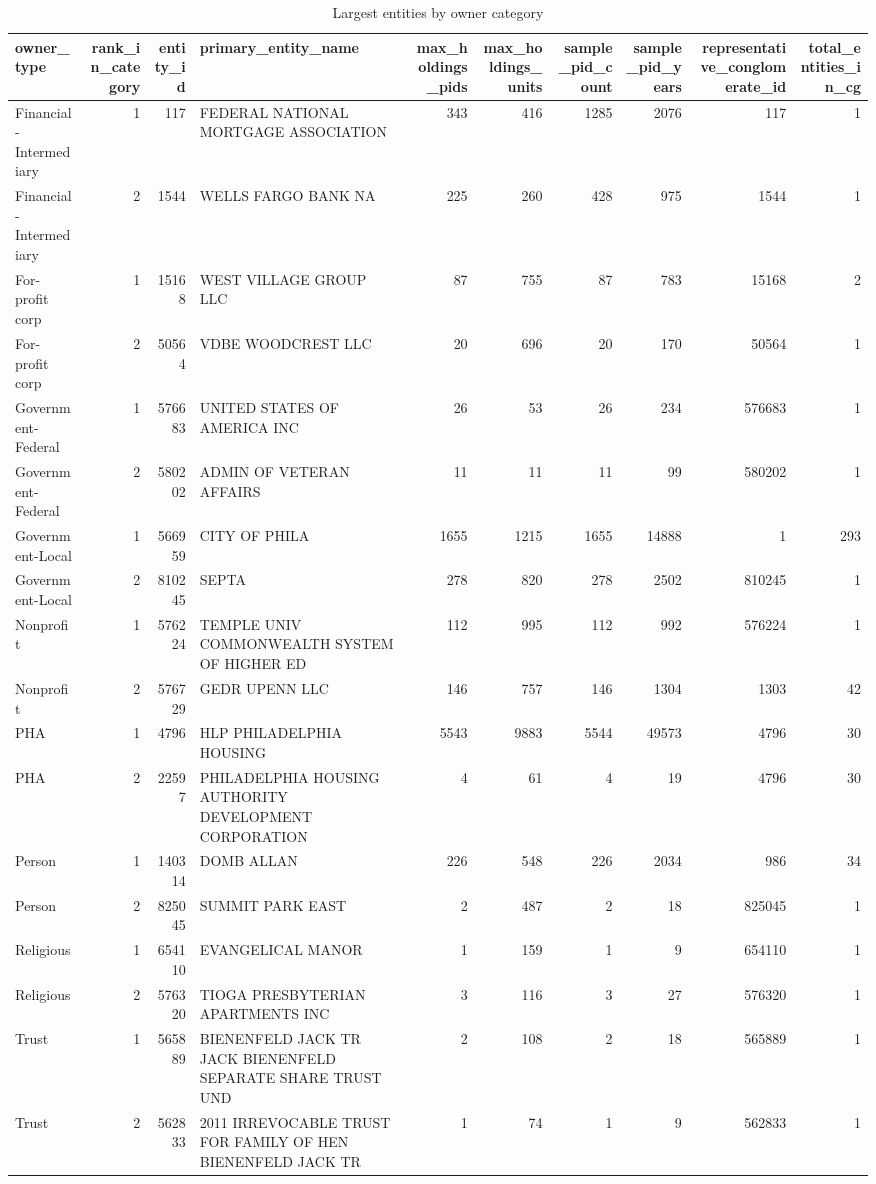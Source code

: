 \begin{table}

\caption{Largest entities by owner category}
\centering
\begin{tabular}[t]{lrrlrrrrrr}
\toprule
owner\_type & rank\_in\_category & entity\_id & primary\_entity\_name & max\_holdings\_pids & max\_holdings\_units & sample\_pid\_count & sample\_pid\_years & representative\_conglomerate\_id & total\_entities\_in\_cg\\
\midrule
Financial-Intermediary & 1 & 117 & FEDERAL NATIONAL MORTGAGE ASSOCIATION & 343 & 416 & 1285 & 2076 & 117 & 1\\
Financial-Intermediary & 2 & 1544 & WELLS FARGO BANK NA & 225 & 260 & 428 & 975 & 1544 & 1\\
For-profit corp & 1 & 15168 & WEST VILLAGE GROUP LLC & 87 & 755 & 87 & 783 & 15168 & 2\\
For-profit corp & 2 & 50564 & VDBE WOODCREST LLC & 20 & 696 & 20 & 170 & 50564 & 1\\
Government-Federal & 1 & 576683 & UNITED STATES OF AMERICA INC & 26 & 53 & 26 & 234 & 576683 & 1\\
Government-Federal & 2 & 580202 & ADMIN OF VETERAN AFFAIRS & 11 & 11 & 11 & 99 & 580202 & 1\\
Government-Local & 1 & 566959 & CITY OF PHILA & 1655 & 1215 & 1655 & 14888 & 1 & 293\\
Government-Local & 2 & 810245 & SEPTA & 278 & 820 & 278 & 2502 & 810245 & 1\\
Nonprofit & 1 & 576224 & TEMPLE UNIV COMMONWEALTH SYSTEM OF HIGHER ED & 112 & 995 & 112 & 992 & 576224 & 1\\
Nonprofit & 2 & 576729 & GEDR UPENN LLC & 146 & 757 & 146 & 1304 & 1303 & 42\\
PHA & 1 & 4796 & HLP PHILADELPHIA HOUSING & 5543 & 9883 & 5544 & 49573 & 4796 & 30\\
PHA & 2 & 22597 & PHILADELPHIA HOUSING AUTHORITY DEVELOPMENT CORPORATION & 4 & 61 & 4 & 19 & 4796 & 30\\
Person & 1 & 140314 & DOMB ALLAN & 226 & 548 & 226 & 2034 & 986 & 34\\
Person & 2 & 825045 & SUMMIT PARK EAST & 2 & 487 & 2 & 18 & 825045 & 1\\
Religious & 1 & 654110 & EVANGELICAL MANOR & 1 & 159 & 1 & 9 & 654110 & 1\\
Religious & 2 & 576320 & TIOGA PRESBYTERIAN APARTMENTS INC & 3 & 116 & 3 & 27 & 576320 & 1\\
Trust & 1 & 565889 & BIENENFELD JACK TR JACK BIENENFELD SEPARATE SHARE TRUST UND & 2 & 108 & 2 & 18 & 565889 & 1\\
Trust & 2 & 562833 & 2011 IRREVOCABLE TRUST FOR FAMILY OF HEN BIENENFELD JACK TR & 1 & 74 & 1 & 9 & 562833 & 1\\
\bottomrule
\end{tabular}
\end{table}
